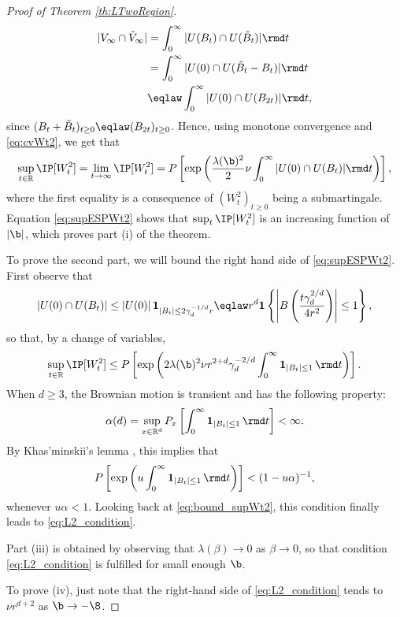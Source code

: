 \begin{proof}[Proof of Theorem \ref{th:LTwoRegion}]
\begin{align*} |V_\infty\cap \tilde{V}_\infty| &= \int_0^\infty |U(B_t)\cap U(\tilde{B}_t)|\rmd t \\
&= \int_0^\infty |U(0)\cap U(\tilde{B}_t-B_t)|\rmd t\\
& \eqlaw \int_0^\infty |U(0)\cap U(B_{2t})|\rmd t,
\end{align*}
since $(B_t + \tilde{B}_t)_{t\geq 0} \eqlaw (B_{2t})_{t\geq 0}$. Hence, using monotone convergence and \eqref{eq:cvWt2}, we get that
\begin{equation} \label{eq:supESPWt2}
\sup_{t\in\mathbb{R}} \IP [W_t^2] = \lim_{t\to\infty} \IP [W_t^2] = P\left[\exp\left(\frac{\lambda(\b)^2}{2} \nu \int_0^\infty |U(0)\cap U(B_{t})|  \rmd t\right) \right],
\end{equation}
where the first equality is a consequence of $(W_t^2)_{t\geq 0}$ being a submartingale. Equation \eqref{eq:supESPWt2} shows that $\sup_{t} \IP[W_t^2]$ is an increasing function of $|\b|$, which proves part (i) of the theorem.

To prove the second part, we will bound the right hand side of \eqref{eq:supESPWt2}. First observe that \[|U(0)\cap U(B_t)| \leq |U(0)| \, \mathbf{1}_{|B_t| \leq 2\gamma_d^{-1/d}r} \eqlaw r^d \mathbf{1} \left\{\left|B\left(\frac{t\gamma_d^{2/d}}{4r^{2}}\right)\right| \leq 1 \right\},\]
so that, by a change of variables,
\begin{equation} \label{eq:bound_supWt2} \sup_{t\in\mathbb{R}} \IP [W_t^2] \leq P\left[\exp\left(2\lambda(\b)^2 \nu r^{2+d}\gamma_d^{-2/d} \int_0^\infty \mathbf{1}_{|B_t| \leq 1} \, \rmd t\right) \right].
\end{equation}
When $d\geq 3$, the Brownian motion is transient and has the following property:
\[\alpha(d) = \sup_{x\in \mathbb{R}^d} P_x \left[ \int_0^\infty \mathbf{1}_{|B_t| \leq 1}\,\rmd t \right] < \infty.\]
By Khas'minskii's lemma \cite[p. 8, Lemma 2.1]{Sznitman}, this implies that
\[P \left[ \exp\left(u \int_0^\infty \mathbf{1}_{|B_t| \leq 1} \, \rmd t\right) \right] < (1-u\alpha)^{-1},\]
whenever $u\alpha < 1$. Looking back at \eqref{eq:bound_supWt2}, this condition finally leads to \eqref{eq:L2_condition}.

Part (iii) is obtained by observing that $\lambda(\beta) \to 0$ as $\beta \to 0$, so that condition \eqref{eq:L2_condition} is fulfilled for small enough $\b$.

To prove (iv), just note that the right-hand side of  \eqref{eq:L2_condition} tends to $\nu r^{d+2}$ as $\b \to -\8$.
\end{proof}

